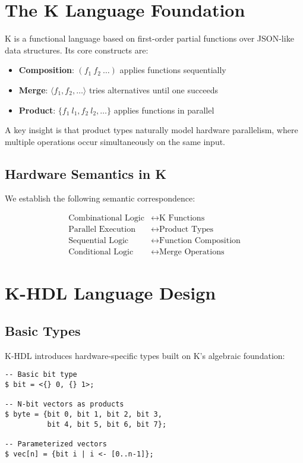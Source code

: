 \documentclass[10pt,twocolumn]{article}
\begin{document}
\section{The K Language Foundation}

K is a functional language based on first-order partial functions over JSON-like data structures. Its core constructs are:

\begin{itemize}
\item \textbf{Composition}: $(f_1\ f_2\ \ldots)$ applies functions sequentially
\item \textbf{Merge}: $\langle f_1, f_2, \ldots \rangle$ tries alternatives until one succeeds
\item \textbf{Product}: $\{f_1\ l_1, f_2\ l_2, \ldots\}$ applies functions in parallel
\end{itemize}

A key insight is that product types naturally model hardware parallelism, where multiple operations occur simultaneously on the same input.

\subsection{Hardware Semantics in K}

We establish the following semantic correspondence:

\begin{align}
\text{Combinational Logic} &\leftrightarrow \text{K Functions}\\
\text{Parallel Execution} &\leftrightarrow \text{Product Types}\\
\text{Sequential Logic} &\leftrightarrow \text{Function Composition}\\
\text{Conditional Logic} &\leftrightarrow \text{Merge Operations}
\end{align}

\section{K-HDL Language Design}

\subsection{Basic Types}

K-HDL introduces hardware-specific types built on K's algebraic foundation:

\begin{lstlisting}
-- Basic bit type
$ bit = <{} 0, {} 1>;

-- N-bit vectors as products
$ byte = {bit 0, bit 1, bit 2, bit 3, 
          bit 4, bit 5, bit 6, bit 7};

-- Parameterized vectors
$ vec[n] = {bit i | i <- [0..n-1]};
\end{lstlisting}
\end{document}
